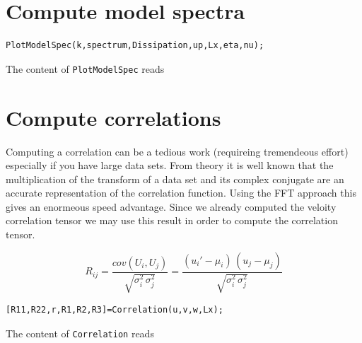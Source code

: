 \documentclass[ntfdMod]{elsarticle}
\begin{document}
\section{Compute model spectra}

\begin{lstlisting}
PlotModelSpec(k,spectrum,Dissipation,up,Lx,eta,nu);
\end{lstlisting}
\begin{par}

The content of \verb|PlotModelSpec| reads


\end{par} \vspace{1em}


\section{Compute correlations}

\begin{par}
Computing a correlation can be a tedious work (requireing tremendeous effort) especially if you have large data sets. From theory it is well known that the multiplication of the transform of a data set and its complex conjugate are an accurate representation of the correlation function. Using the FFT approach this gives an enormeous speed advantage. Since we already computed the veloity correlation tensor we may use this result in order to compute the correlation tensor.
\end{par} \vspace{1em}
\begin{par}

  \begin{equation}
      R_{ij} = \frac{cov(U_i,U_j)}{\sqrt{\sigma_i^2\,\sigma_j^2}}
             = \frac{(u_i'-\mu_i)\,(u_j-\mu_j)}{\sqrt{\sigma_i^2\,\sigma_j^2}}
  \end{equation}

\end{par} \vspace{1em}
\begin{lstlisting}
[R11,R22,r,R1,R2,R3]=Correlation(u,v,w,Lx);
\end{lstlisting}
\begin{par}

The content of \verb|Correlation| reads


\end{par} \vspace{1em}
\end{document}

